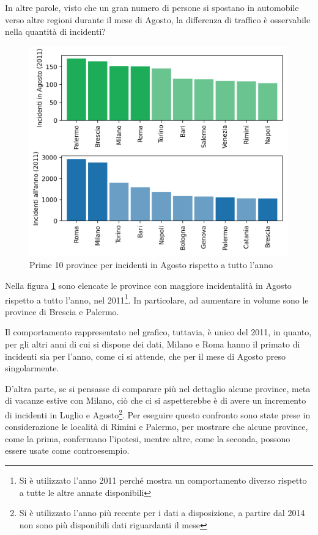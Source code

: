 \documentclass[a4paper,12pt]{report}
\begin{document}
In altre parole, visto che un gran numero di persone si spostano in automobile 
verso altre regioni durante il mese di Agosto, la differenza di traffico è osservabile 
nella quantità di incidenti?

\begin{figure}
    \includegraphics[width=\linewidth]{../src/incidenti/incidenti_senza_coords/mese_incidenti/mesi_estivi.png}
    \caption{Prime 10 province per incidenti in Agosto rispetto a tutto l'anno}
    \label{fig:mesi-estivi}
\end{figure}

Nella figura \ref{fig:mesi-estivi} sono elencate le province con maggiore incidentalità 
in Agosto rispetto a tutto l'anno, nel 
2011\footnote{Si è utilizzato l'anno 2011 perché mostra un comportamento diverso rispetto a 
tutte le altre annate disponibili}. 
In particolare, ad aumentare in volume sono le province di Brescia e Palermo.

Il comportamento rappresentato nel grafico, tuttavia, è unico del 2011, in quanto, 
per gli altri anni di cui si dispone dei dati, 
Milano e Roma hanno il primato di incidenti sia per l'anno, come ci si attende, che per il 
mese di Agosto preso singolarmente.

D'altra parte, se si pensasse di comparare più nel dettaglio alcune province, 
meta di vacanze estive con Milano, ciò che ci si aspetterebbe è 
di avere un incremento di incidenti in Luglio e 
Agosto\footnote{Si è utilizzato l'anno più recente per i dati a disposizione, 
a partire dal 2014 non sono più disponibili dati riguardanti il mese}.
Per eseguire questo confronto sono state prese in considerazione le 
località di Rimini e Palermo, per mostrare che alcune province, come la prima, 
confermano l'ipotesi, mentre altre, 
come la seconda, possono essere usate come controesempio.
\end{document}

